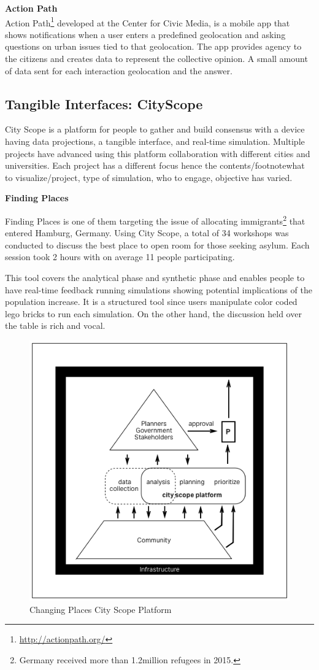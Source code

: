 \textbf{Action Path}\\
Action Path\footnote{\url{http://actionpath.org/}} \cite{graeff2014crowdsourcing} developed at
the Center for Civic Media, is a mobile app that shows notifications when a
user enters a predefined geolocation and asking questions on urban issues
tied to that geolocation. The app provides agency to the citizens and
creates data to represent the collective opinion. A small amount of data
sent for each interaction geolocation and the answer.

\subsection{Tangible Interfaces: CityScope}

City Scope is a platform for people to gather and build consensus with a
device having data projections, a tangible interface, and real-time
simulation. Multiple projects have advanced using this platform
collaboration with different cities and universities. Each project has a
different focus hence the contents/footnote{what to visualize/project, type
of simulation, who to engage, objective} has varied.

\textbf{Finding Places}

Finding Places is one of them targeting the issue of allocating
immigrants\footnote{Germany received more than 1.2million refugees in 2015.} that
entered Hamburg, Germany. Using City Scope, a total of 34 workshops was
conducted to discuss the best place to open room for those seeking asylum.
Each session took 2 hours with on average 11 people participating.

This tool covers the analytical phase and synthetic phase and enables
people to have real-time feedback running simulations showing potential
implications of the population increase. It is a structured tool since
users manipulate color coded lego bricks to run each simulation. On the
other hand, the discussion held over the table is rich and vocal.

\begin{figure}[htb]
  \includegraphics[width=\textwidth]{chapters/3/fig/cityscope.png}               
  \caption[diagram: cityscope]{Changing Places City Scope Platform}
  \label{fig:diagram_cityscope}
\end{figure}

